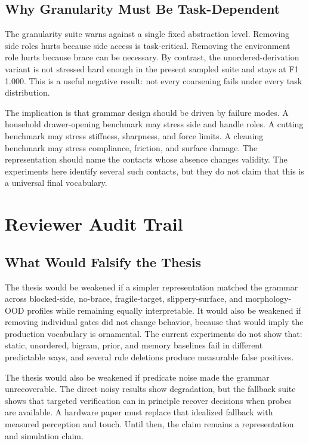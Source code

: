 \documentclass{article}
\begin{document}
\subsection{Why Granularity Must Be Task-Dependent}

The granularity suite warns against a single fixed abstraction level. Removing side roles hurts because side access is task-critical. Removing the environment role hurts because brace can be necessary. By contrast, the unordered-derivation variant is not stressed hard enough in the present sampled suite and stays at F1 1.000. This is a useful negative result: not every coarsening fails under every task distribution.

The implication is that grammar design should be driven by failure modes. A household drawer-opening benchmark may stress side and handle roles. A cutting benchmark may stress stiffness, sharpness, and force limits. A cleaning benchmark may stress compliance, friction, and surface damage. The representation should name the contacts whose absence changes validity. The experiments here identify several such contacts, but they do not claim that this is a universal final vocabulary.

\section{Reviewer Audit Trail}

\subsection{What Would Falsify the Thesis}

The thesis would be weakened if a simpler representation matched the grammar across blocked-side, no-brace, fragile-target, slippery-surface, and morphology-OOD profiles while remaining equally interpretable. It would also be weakened if removing individual gates did not change behavior, because that would imply the production vocabulary is ornamental. The current experiments do not show that: static, unordered, bigram, prior, and memory baselines fail in different predictable ways, and several rule deletions produce measurable false positives.

The thesis would also be weakened if predicate noise made the grammar unrecoverable. The direct noisy results show degradation, but the fallback suite shows that targeted verification can in principle recover decisions when probes are available. A hardware paper must replace that idealized fallback with measured perception and touch. Until then, the claim remains a representation and simulation claim.
\end{document}

